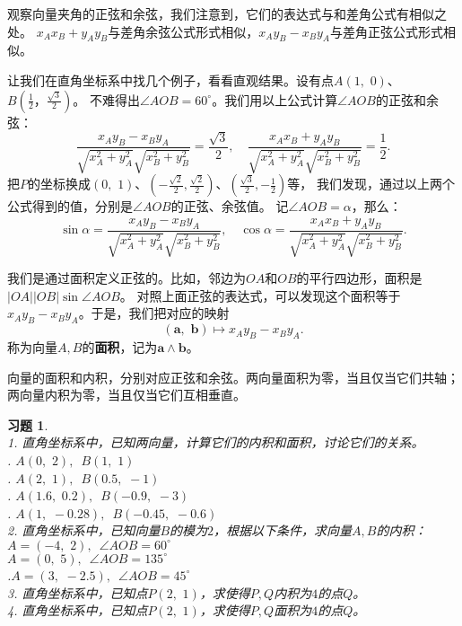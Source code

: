 \documentclass[12pt,UTF8]{ctexbook}
\theoremstyle{definition}
\theoremstyle{plain}
\newtheorem{xt}{习题}[section]
\begin{document}
观察向量夹角的正弦和余弦，我们注意到，它们的表达式与和差角公式有相似之处。
$x_Ax_B + y_Ay_B$与差角余弦公式形式相似，$x_Ay_B - x_By_A$与差角正弦公式形式相似。

让我们在直角坐标系中找几个例子，看看直观结果。设有点$A(1,\,\,0)$、$B(\frac{1}{2}，\frac{\sqrt{3}}{2})$。
不难得出$\angle AOB = 60^\circ$。我们用以上公式计算$\angle AOB$的正弦和余弦：
$$ \frac{x_Ay_B - x_By_A}{\sqrt{x_A^2 + y_A^2}\sqrt{x_B^2 + y_B^2}} = \frac{\sqrt{3}}{2}, \quad \frac{x_Ax_B + y_Ay_B}{\sqrt{x_A^2 + y_A^2} \sqrt{x_B^2 + y_B^2}} = \frac{1}{2}. $$
把$P$的坐标换成$(0,\,\,1)$、$(-\frac{\sqrt{2}}{2}, \frac{\sqrt{2}}{2})$、$(\frac{\sqrt{3}}{2},-\frac{1}{2})$等，
我们发现，通过以上两个公式得到的值，分别是$\angle AOB$的正弦、余弦值。
记$\angle AOB = \alpha$，那么：
$$ \sin \alpha = \frac{x_Ay_B - x_By_A}{\sqrt{x_A^2 + y_A^2}\sqrt{x_B^2 + y_B^2}}, \quad \cos \alpha = \frac{x_Ax_B + y_Ay_B}{\sqrt{x_A^2 + y_A^2} \sqrt{x_B^2 + y_B^2}}. $$

我们是通过面积定义正弦的。比如，邻边为$OA$和$OB$的平行四边形，面积是$|OA||OB|\sin \angle AOB$。
对照上面正弦的表达式，可以发现这个面积等于$x_Ay_B - x_By_A$。于是，我们把对应的映射
$$ (\mathbf{a}, \,\,\mathbf{b}) \mapsto x_Ay_B - x_By_A. $$
称为向量$A, B$的\textbf{面积}，记为$\mathbf{a} \wedge \mathbf{b}$。

向量的面积和内积，分别对应正弦和余弦。两向量面积为零，当且仅当它们共轴；两向量内积为零，当且仅当它们互相垂直。

\begin{xt}
    \mbox{} \\
    1. 直角坐标系中，已知两向量，计算它们的内积和面积，讨论它们的关系。\\
    . $A(0,\,\, 2), \,\,\, B(1, \,\,1)$ \\
    . $A(2,\,\, 1),\,\,\,  B(0.5, \,\,-1)$ \\
    . $A(1.6,\,\, 0.2), \,\,\, B(-0.9,\,\, -3)$\\
    . $A(1, \,\,-0.28), \,\,\, B(-0.45,\,\, -0.6)$\\
    2. 直角坐标系中，已知向量$B$的模为$2$，根据以下条件，求向量$A,B$的内积：\\
     $A = (-4, \,\,2), \,\,\, \angle AOB = 60^\circ$\\
     $A= (0,\,\, 5), \,\,\,\angle AOB = 135^\circ$\\
    .$A = (3,\,\, -2.5), \,\,\,\angle AOB = 45^\circ$\\
    3. 直角坐标系中，已知点$P(2,\,\,1)$，求使得$P,Q$内积为$4$的点$Q$。\\
    4. 直角坐标系中，已知点$P(2,\,\,1)$，求使得$P,Q$面积为$4$的点$Q$。
\end{xt}
\end{document}
